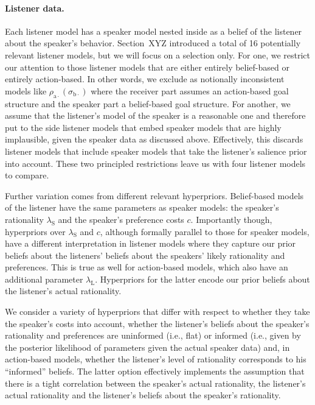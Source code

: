 \paragraph{Listener data.} Each listener model has a speaker model
nested inside as a belief of the listener about the speaker's
behavior. Section~XYZ  introduced a total of 16
potentially relevant listener models, but we will focus on a selection
only. For one, we restrict our attention to those listener models that
are either entirely belief-based or entirely action-based. In other
words, we exclude as notionally inconsistent models like
$\rho_{\mathrm{a}\cdot}(\sigma_{\mathrm{b}\cdot})$ where the receiver
part assumes an action-based goal structure and the speaker part a
belief-based goal structure. For another, we assume that the
listener's model of the speaker is a reasonable one and therefore put
to the side listener models that embed speaker models that are highly
implausible, given the speaker data as discussed above. Effectively,
this discards listener models that include speaker models that take
the listener's salience prior into account. These two principled
restrictions leave us with four listener models to compare.

Further variation comes from different relevant
hyperpriors. Belief-based models of the listener have the same
parameters as speaker models: the speaker's rationality
$\lambda_\mathrm{S}$ and the speaker's preference costs
$c$. Importantly though, hyperpriors over $\lambda_\mathrm{S}$ and
$c$, although formally parallel to those for speaker models, have a
different interpretation in listener models where they capture our
prior beliefs about the listeners' beliefs about the speakers' likely
rationality and preferences. This is true as well for action-based
models, which also have an additional parameter
$\lambda_\mathrm{L}$. Hyperpriors for the latter encode our prior
beliefs about the listener's actual rationality.

We consider a variety of hyperpriors that differ with respect to
whether they take the speaker's costs into account, whether the
listener's beliefs about the speaker's rationality and preferences are
uninformed (i.e., flat) or informed (i.e., given by the posterior
likelihood of parameters given the actual speaker data) and, in
action-based models, whether the listener's level of rationality
corresponds to his ``informed'' beliefs. The latter option effectively
implements the assumption that there is a tight correlation between
the speaker's actual rationality, the listener's actual rationality
and the listener's beliefs about the speaker's rationality.

